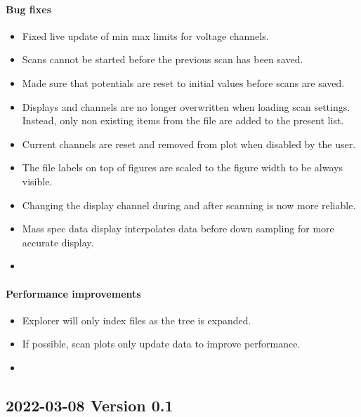 \documentclass[a4paper,11pt,DIV=13]{scrartcl}
\begin{document}
\paragraph{Bug fixes}
\begin{itemize}
\item Fixed live update of min max limits for voltage channels.
\item Scans cannot be started before the previous scan has been saved.
\item Made sure that potentials are reset to initial values before scans are saved.
\item Displays and channels are no longer overwritten when loading scan settings. Instead, only non existing items from the file are added to the present list.
\item Current channels are reset and removed from plot when disabled by the user.
\item The file labels on top of figures are scaled to the figure width to be always visible.
\item Changing the display channel during and after scanning is now more reliable.
\item Mass spec data display interpolates data before down sampling for more accurate display.
\item
\end{itemize}

\paragraph{Performance improvements}
\begin{itemize}
\item Explorer will only index files as the tree is expanded.
\item If possible, scan plots only update data to improve performance.
\item
\end{itemize}

\subsection{2022-03-08 Version 0.1}
\end{document}
